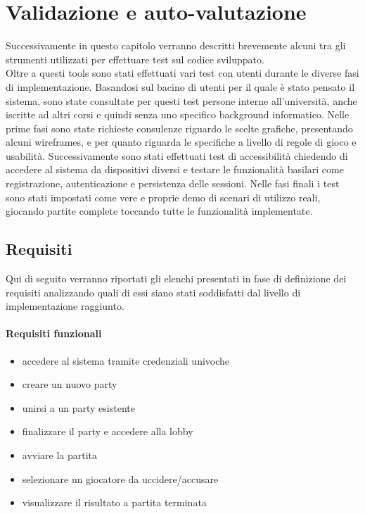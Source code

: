\section{Validazione e auto-valutazione}
Successivamente in questo capitolo verranno descritti brevemente alcuni tra gli strumenti utilizzati per effettuare test sul codice sviluppato.\\[\baselineskip]\indent
Oltre a questi tools sono stati effettuati vari test con utenti durante le diverse fasi di implementazione. Basandosi sul bacino di utenti per il quale è stato pensato il sistema, sono state consultate per questi test persone interne all'università, anche iscritte ad altri corsi e quindi senza uno specifico background informatico.
Nelle prime fasi sono state richieste consulenze riguardo le scelte grafiche, presentando alcuni wireframes, e per quanto riguarda le specifiche a livello di regole di gioco e usabilità. Successivamente sono stati effettuati test di accessibilità chiedendo di accedere al sistema da dispositivi diversi e testare le funzionalità basilari come registrazione, autenticazione e persistenza delle sessioni. Nelle fasi finali i test sono stati impostati come vere e proprie demo di scenari di utilizzo reali, giocando partite complete toccando tutte le funzionalità implementate.



\subsection{Requisiti}
Qui di seguito verranno riportati gli elenchi presentati in fase di definizione dei requisiti analizzando quali di essi siano stati soddisfatti dal livello di implementazione raggiunto.
\paragraph{Requisiti funzionali}

\begin{itemize}[label={\checkmark}]
    \item accedere al sistema tramite credenziali univoche
    \item creare un nuovo party
    \item unirsi a un party esistente
    \item finalizzare il party e accedere alla lobby 
    \item avviare la partita
    \item selezionare un giocatore da uccidere/accusare
    \item visualizzare il risultato a partita terminata
\end{itemize}

